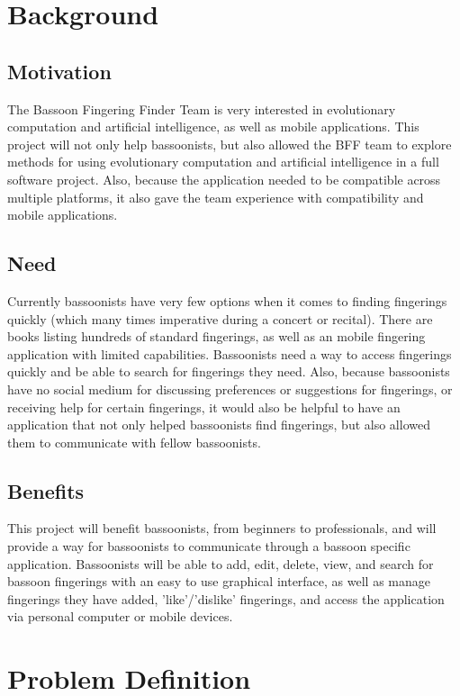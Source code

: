 \documentclass[12pt,english]{article}
\begin{document}
\section{Background}
\subsection{Motivation}
The Bassoon Fingering Finder Team is very interested in evolutionary
computation and artificial intelligence, as well as mobile applications.
This project will not only help bassoonists, but also allowed the
BFF team to explore methods for using evolutionary computation and
artificial intelligence in a full software project. Also, because
the application needed to be compatible across multiple platforms,
it also gave the team experience with compatibility and mobile applications.

\subsection{Need}
Currently bassoonists have very few options when it comes to finding
fingerings quickly (which many times imperative during a concert or
recital). There are books listing hundreds of standard fingerings,
as well as an mobile fingering application with limited capabilities.
Bassoonists need a way to access fingerings quickly and be able to
search for fingerings they need. Also, because bassoonists have no
social medium for discussing preferences or suggestions for fingerings,
or receiving help for certain fingerings, it would also be helpful
to have an application that not only helped bassoonists find fingerings,
but also allowed them to communicate with fellow bassoonists.

\subsection{Benefits}
This project will benefit bassoonists, from beginners to professionals,
and will provide a way for bassoonists to communicate through a bassoon
specific application. Bassoonists will be able to add, edit, delete,
view, and search for bassoon fingerings with an easy to use graphical
interface, as well as manage fingerings they have added, 'like'/'dislike'
fingerings, and access the application via personal computer or mobile
devices.

\section{Problem Definition}
\end{document}
